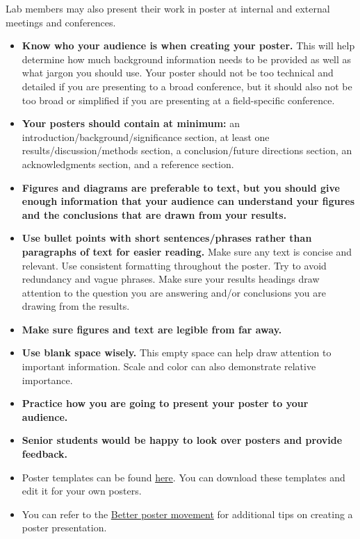 \documentclass[
]{book}
\begin{document}
Lab members may also present their work in poster at internal and external meetings and conferences.

\begin{itemize}
\item
  \textbf{Know who your audience is when creating your poster.} This will help determine how much background information needs to be provided as well as what jargon you should use. Your poster should not be too technical and detailed if you are presenting to a broad conference, but it should also not be too broad or simplified if you are presenting at a field-specific conference.
\item
  \textbf{Your posters should contain at minimum:} an introduction/background/significance section, at least one results/discussion/methods section, a conclusion/future directions section, an acknowledgments section, and a reference section.
\item
  \textbf{Figures and diagrams are preferable to text, but you should give enough information that your audience can understand your figures and the conclusions that are drawn from your results.}
\item
  \textbf{Use bullet points with short sentences/phrases rather than paragraphs of text for easier reading.} Make sure any text is concise and relevant. Use consistent formatting throughout the poster. Try to avoid redundancy and vague phrases. Make sure your results headings draw attention to the question you are answering and/or conclusions you are drawing from the results.
\item
  \textbf{Make sure figures and text are legible from far away.}
\item
  \textbf{Use blank space wisely.} This empty space can help draw attention to important information. Scale and color can also demonstrate relative importance.
\item
  \textbf{Practice how you are going to present your poster to your audience.}
\item
  \textbf{Senior students would be happy to look over posters and provide feedback.}
\item
  Poster templates can be found \href{https://drive.google.com/drive/folders/1V1ykFkQy5sY_4hgSlZhh6y-axiy3mreH?usp=sharing}{here}. You can download these templates and edit it for your own posters.
\item
  You can refer to the \href{https://www.insidehighered.com/news/2019/06/24/theres-movement-better-scientific-posters-are-they-really-better}{Better poster movement} for additional tips on creating a poster presentation.
\end{itemize}
\end{document}
